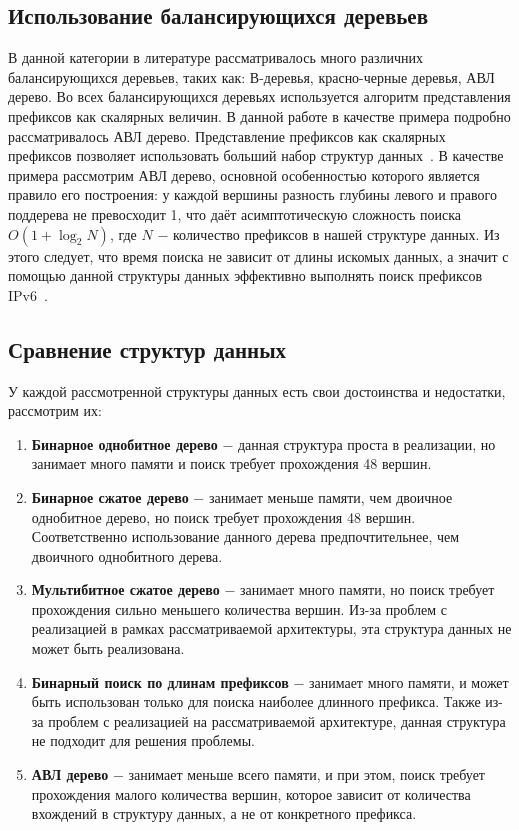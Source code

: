 \documentclass[conference]{IEEEtran}
\begin{document}
        \subsection{Использование балансирующихся деревьев}
            \label{section:avlrev}
            В данной категории в литературе рассматривалось много различних балансирующихся деревьев, таких как: В-деревья,
            красно-черные деревья, АВЛ дерево. Во всех балансирующихся деревьях используется алгоритм представления префиксов
            как скалярных величин.
            В данной работе в качестве примера подробно рассматривалось АВЛ дерево.
            Представление префиксов как скалярных префиксов позволяет использовать больший набор структур данных~\cite{behdadfar2009scalar}. 
            В качестве примера рассмотрим АВЛ дерево, основной особенностью которого является правило его построения: у каждой вершины разность 
            глубины левого и правого поддерева не превосходит 1, что даёт асимптотическую сложность поиска {\ttfamily $O(1+\log_2{N})$}, 
            где {\ttfamily $N$} $-$ количество префиксов в нашей структуре данных. Из этого следует, что время поиска не зависит от длины искомых данных,
            а значит с помощью данной структуры данных эффективно выполнять поиск префиксов IPv6~\cite{behdadfar2011coded}.
            \\
    \subsection{Сравнение структур данных}
        У каждой рассмотренной структуры данных есть свои достоинства и недостатки, рассмотрим их:
        \begin{enumerate}
            \item \textbf{Бинарное однобитное дерево} $-$ данная структура проста в реализации, но занимает много памяти и поиск требует прохождения 48 вершин.
            \item \textbf{Бинарное сжатое дерево} $-$ занимает меньше памяти, чем двоичное однобитное дерево, но поиск требует прохождения 48 вершин. 
                Соответственно использование данного дерева предпочтительнее, чем двоичного однобитного дерева.
            \item \textbf{Мультибитное сжатое дерево} $-$ занимает много памяти, но поиск требует прохождения сильно меньшего количества вершин. 
                Из-за проблем с реализацией в рамках рассматриваемой архитектуры, эта структура данных не может быть реализована.
            \item \textbf{Бинарный поиск по длинам префиксов} $-$ занимает много памяти, и может быть использован только для поиска наиболее длинного префикса.
                Также из-за проблем с реализацией на рассматриваемой архитектуре, данная структура не подходит для решения проблемы.
            \item \textbf{АВЛ дерево} $-$ занимает меньше всего памяти, и при этом, поиск требует прохождения малого количества вершин,
                которое зависит от количества вхождений в структуру данных, а не от конкретного префикса.
        \end{enumerate}
\end{document}
